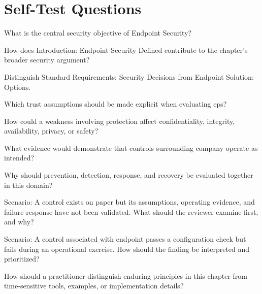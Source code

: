 \documentclass[11pt,letterpaper]{article}
\begin{document}
\section*{Self-Test Questions}
\begin{CornellRecallList}
\item What is the central security objective of Endpoint Security?
\item How does Introduction: Endpoint Security Defined contribute to the chapter's broader security argument?
\item Distinguish Standard Requirements: Security Decisions from Endpoint Solution: Options.
\item Which trust assumptions should be made explicit when evaluating eps?
\item How could a weakness involving protection affect confidentiality, integrity, availability, privacy, or safety?
\item What evidence would demonstrate that controls surrounding company operate as intended?
\item Why should prevention, detection, response, and recovery be evaluated together in this domain?
\item Scenario: A control exists on paper but its assumptions, operating evidence, and failure response have not been validated. What should the reviewer examine first, and why?
\item Scenario: A control associated with endpoint passes a configuration check but fails during an operational exercise. How should the finding be interpreted and prioritized?
\item How should a practitioner distinguish enduring principles in this chapter from time-sensitive tools, examples, or implementation details?
\end{CornellRecallList}
\end{document}
